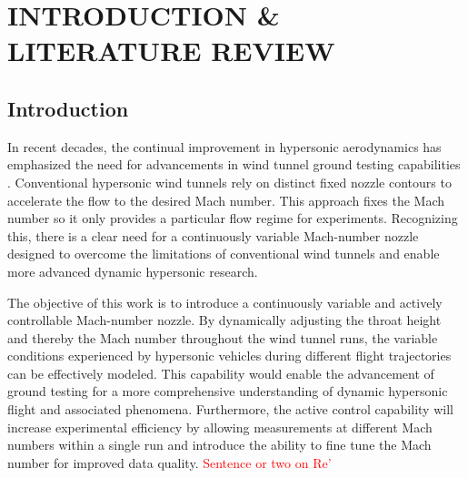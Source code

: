 %
%  
%



\pagestyle{plain} %
\setcounter{page}{1}


\chapter{INTRODUCTION \& LITERATURE REVIEW}

\section{Introduction}

In recent decades, the continual improvement in hypersonic aerodynamics has emphasized the need for advancements in wind tunnel ground testing capabilities \cite{leyva}. Conventional hypersonic wind tunnels rely on distinct fixed nozzle contours to accelerate the flow to the desired Mach number. This approach fixes the Mach number so it only provides a particular flow regime for experiments. Recognizing this, there is a clear need for a continuously variable Mach-number nozzle designed to overcome the limitations of conventional wind tunnels and enable more advanced dynamic hypersonic research.

The objective of this work is to introduce a continuously variable and actively controllable Mach-number nozzle. By dynamically adjusting the throat height and thereby the Mach number throughout the wind tunnel runs, the variable conditions experienced by hypersonic vehicles during different flight trajectories can be effectively modeled. This capability would enable the advancement of ground testing for a more comprehensive understanding of dynamic hypersonic flight and associated phenomena. Furthermore, the active control capability will increase experimental efficiency by allowing measurements at different Mach numbers within a single run and introduce the ability to fine tune the Mach number for improved data quality. \textcolor{red}{Sentence or two on Re'}

